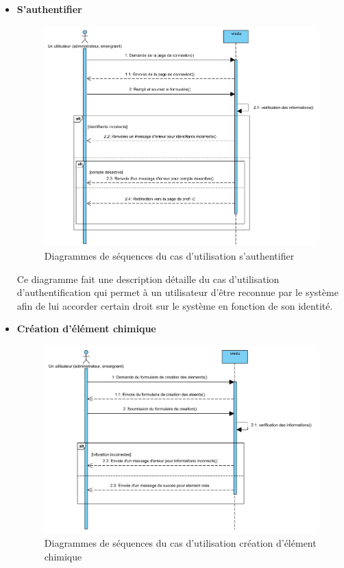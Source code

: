 \begin{itemize}
	\item \textbf{S’authentifier}

	      \begin{figure}[H]
		      \centering
		      \includegraphics[width=1\textwidth]{img/ucdAuth}
		      \caption{Diagrammes de séquences du cas d'utilisation s’authentifier}
		      \label{fig:mesh1}
	      \end{figure}

	      Ce diagramme fait une description détaille du cas d’utilisation d’authentification qui permet à un utilisateur d’être reconnue par le système afin de lui accorder certain droit sur le système en fonction de son identité.


	\item \textbf{Création d’élément chimique}

	      \begin{figure}[H]
		      \centering
		      \includegraphics[width=1\textwidth]{img/ucdElCr}
		      \caption{Diagrammes de séquences du cas d'utilisation création d’élément chimique}
		      \label{fig:mesh1}
	      \end{figure}


\end{itemize}
